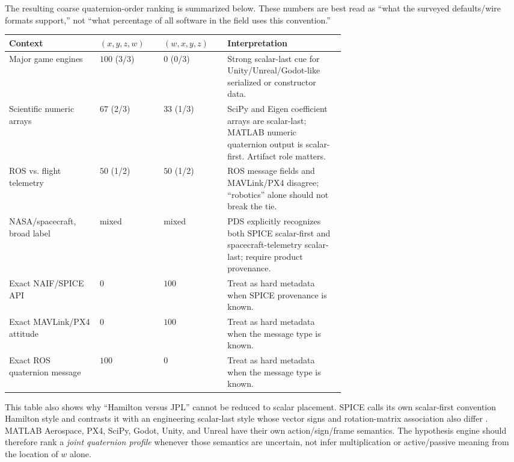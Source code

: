 \documentclass[11pt]{article}
\begin{document}
    The resulting coarse quaternion-order ranking is summarized below. These numbers are
    best read as ``what the surveyed defaults/wire formats support,'' not ``what percentage
    of all software in the field uses this convention.''

    \begin{center}
        \small
        \begin{tabularx}{\linewidth}{@{}p{0.27\linewidth}p{0.19\linewidth}p{0.19\linewidth}Y@{}}
\toprule
Context & $(x,y,z,w)$ & $(w,x,y,z)$ & Interpretation \\
\midrule
Major game engines & $100$ (3/3) & $0$ (0/3) & Strong scalar-last cue for Unity/Unreal/Godot-like serialized or constructor data. \\
Scientific numeric arrays & $67$ (2/3) & $33$ (1/3) & SciPy and Eigen coefficient arrays are scalar-last; MATLAB numeric quaternion output is scalar-first. Artifact role matters. \\
ROS vs. flight telemetry & $50$ (1/2) & $50$ (1/2) & ROS message fields and MAVLink/PX4 disagree; ``robotics'' alone should not break the tie. \\
NASA/spacecraft, broad label & mixed & mixed & PDS explicitly recognizes both SPICE scalar-first and spacecraft-telemetry scalar-last; require product provenance. \\
Exact NAIF/SPICE API & $0$ & $100$ & Treat as hard metadata when SPICE provenance is known. \\
Exact MAVLink/PX4 attitude & $0$ & $100$ & Treat as hard metadata when the message type is known. \\
Exact ROS quaternion message & $100$ & $0$ & Treat as hard metadata when the message type is known. \\
\bottomrule
        \end{tabularx}
    \end{center}

    This table also shows why ``Hamilton versus JPL'' cannot be reduced to scalar placement.
    SPICE calls its own scalar-first convention Hamilton style and contrasts it with an
    engineering scalar-last style whose vector signs and rotation-matrix association also
    differ \cite{naifQuaternion}. MATLAB Aerospace, PX4, SciPy, Godot, Unity, and Unreal
    have their own action/sign/frame semantics. The hypothesis engine should therefore
    rank a \emph{joint quaternion profile} whenever those semantics are uncertain, not infer
    multiplication or active/passive meaning from the location of $w$ alone.
\end{document}
